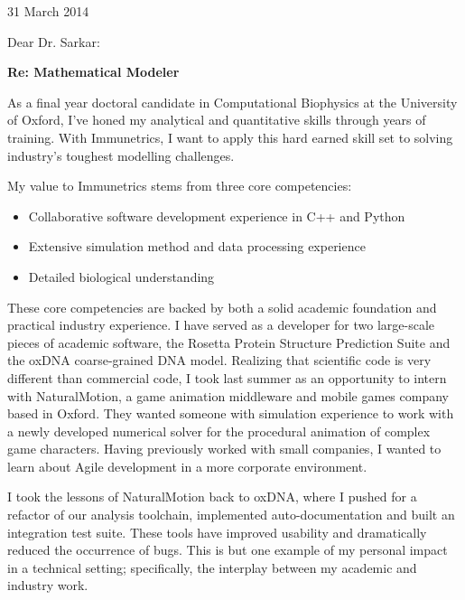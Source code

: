 \documentclass{../res}
\begin{document}
 
\begin{sloppypar}
 
%


\begin{resume} 
 
31 March 2014



Dear Dr. Sarkar:

\textbf{Re: Mathematical Modeler}

As a final year doctoral candidate in Computational Biophysics at the University of Oxford, I've honed my analytical and quantitative skills through years of training. With Immunetrics, I want to apply this hard earned skill set to solving industry's toughest modelling challenges. 

My value to Immunetrics stems from three core competencies: 
\begin{itemize}[itemindent=1cm]
    \item Collaborative software development experience in C++ and Python
    \item Extensive simulation method and data processing experience
    \item Detailed biological understanding
\end{itemize}

These core competencies are backed by both a solid academic foundation and practical industry experience. I have served as a developer for two large-scale pieces of academic software, the Rosetta Protein Structure Prediction Suite and the oxDNA coarse-grained DNA model. Realizing that scientific code is very different than commercial code, I took last summer as an opportunity to intern with NaturalMotion, a game animation middleware and mobile games company based in Oxford. They wanted someone with simulation experience to work with a newly developed numerical solver for the procedural animation of complex game characters. Having previously worked with small companies, I wanted to learn about Agile development in a more corporate environment. 

I took the lessons of NaturalMotion back to oxDNA, where I pushed for a refactor of our analysis toolchain, implemented auto-documentation and built an integration test suite. These tools have improved usability and dramatically reduced the occurrence of bugs. This is but one example of my personal impact in a technical setting; specifically, the interplay between my academic and industry work.


\end{resume}
\end{sloppypar}
\end{document}
